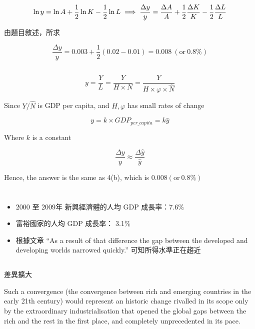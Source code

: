 \documentclass[11pt]{article}
\begin{document}
$$
\ln y = \ln A + \frac{1}{2} \ln{K} - \frac{1}{2} \ln{L} \\
\implies \frac{\Delta y}{y} = \frac{\Delta A}{A} + \frac{1}{2}\frac{\Delta K}{K} -  \frac{1}{2}\frac{\Delta L}{L}
$$

由題目敘述，所求

$$
\frac{\Delta y}{y} = 0.003 + \frac{1}{2}(0.02-0.01) = 0.008 \ (\text{or} \ 0.8\%)
$$

\subsection{}

$$
y = \frac{Y}{L} = \frac{Y}{H \times N} = \frac{Y}{H \times \varphi \times \hat{N}}
$$

Since $Y / \hat{N}$ is GDP per capita, and $H, \varphi$ has small rates of change

$$
y = k\times GDP_{per\_capita} = k \hat{y}
$$

Where $k$  is a constant

$$
 \frac{\Delta y}{y}  \approx  \frac{\Delta \hat{y}}{\hat{y}}
$$

Hence, the answer is the same as 4(b), which is $0.008(\text{or} \ 0.8\%)$

\section{}
\subsection{}
\begin{itemize}
    \item 2000 至 2009年 新興經濟體的人均 GDP 成長率：7.6\%
    \item 富裕國家的人均 GDP 成長率： 3.1\%
    \item 根據文章 “As a result of that difference the gap between the developed and developing worlds narrowed quickly.” 可知所得水準正在趨近
\end{itemize}

\subsection{}
差異擴大

Such a convergence (the convergence between rich and emerging countries in the early 21th century) would represent an historic change rivalled in its scope only by the extraordinary industrialisation that opened the global gaps between the rich and the rest in the first place, and completely unprecedented in its pace.
\end{document}
